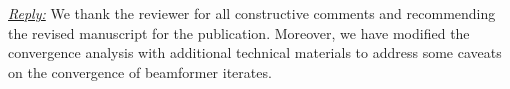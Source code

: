 
\vspace{1eM}
\underline{\textit{Reply:}} We thank the reviewer for all constructive comments and recommending the revised manuscript for the publication. Moreover, we have modified the convergence analysis with additional technical materials to address some caveats on the convergence of beamformer iterates.
